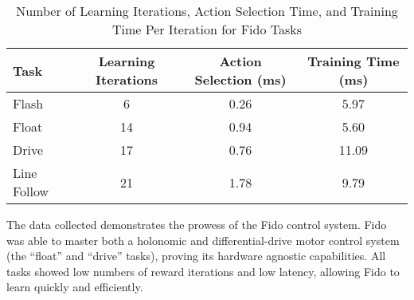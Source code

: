 \begin{table}[ht]
	\centering
	\begin{tabular}{@{}lccc@{}}
		\toprule
		Task        & Learning Iterations & Action Selection (ms) & Training Time (ms) \\ \midrule
		Flash       & 6                   & 0.26                  & 5.97               \\
		Float       & 14                  & 0.94                  & 5.60               \\
		Drive       & 17                  & 0.76                  & 11.09              \\
		Line Follow & 21                  & 1.78                  & 9.79               \\ \bottomrule
	\end{tabular}
	\caption{Number of Learning Iterations, Action Selection Time, and Training Time Per Iteration for Fido Tasks}
	\label{tab:data}
\end{table}

The data collected demonstrates the prowess of the Fido control system.   Fido was able to master both a holonomic and differential-drive motor control system (the ``float'' and ``drive'' tasks), proving its hardware agnostic capabilities.  All tasks showed low numbers of reward iterations and low latency, allowing Fido to learn quickly and efficiently.